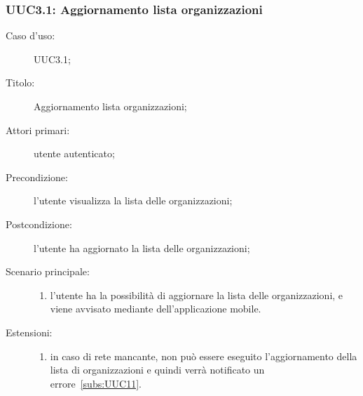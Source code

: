 \documentclass[../../../analisi-dei-requisiti.tex]{subfiles}
\begin{document}
\subsubsection{UUC3.1: Aggiornamento lista organizzazioni}%
\label{subs:UUC3.1}
\begin{description}
  \item[Caso d’uso:] UUC3.1;
  \item[Titolo:] Aggiornamento lista organizzazioni;
  \item[Attori primari:] utente autenticato;
  \item[Precondizione:] l'utente visualizza la lista delle organizzazioni;
  \item[Postcondizione:] l'utente ha aggiornato la lista delle organizzazioni;
  \item[Scenario principale:]
        \begin{enumerate}
          \item l'utente ha la possibilità di aggiornare la lista delle organizzazioni, e viene avvisato mediante  dell'applicazione mobile.
        \end{enumerate}
  \item[Estensioni:]
        \begin{enumerate}
          \item in caso di rete mancante, non può essere eseguito l'aggiornamento della lista di organizzazioni e quindi verrà notificato un errore~\ref{subs:UUC11}.
        \end{enumerate}
\end{description}
\end{document}
